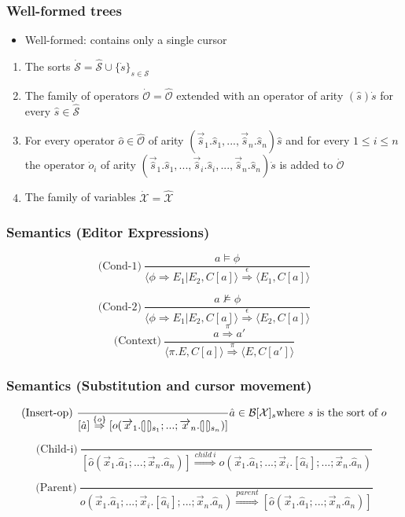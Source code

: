 \documentclass[t,24pt,aspectratio=169]{beamer}
\newcommand{\cleftsemicirc}{\put(3.5,2.5){\oval(5,10)[l]}\put(3.5,-2.5){\line(0,0){10}}\phantom{\circ}}
\newcommand{\crightsemicirc}{\put(1.5,2.5){\oval(5,10)[r]}\put(1.5,-2.5){\line(0,0){10}}\phantom{\circ}}
\newcommand{\hole}{\cleftsemicirc \crightsemicirc}
\newcommand{\hole}[1]{\llparenthesis \ \rrparenthesis_#1} %
\renewcommand{\vec}[1]{\overrightarrow{#1}}
\begin{document}
\begin{frame}
    \frametitle{Well-formed trees}
    \begin{itemize}
        \item Well-formed: contains only a single cursor
    \end{itemize}
    \vspace{1cm}
    \begin{enumerate}
        \item The sorts $\dot{\mathcal{S}} = \hat{\mathcal{S}} \cup \{ \dot{s} \}_{s \in \mathcal{S}}$
        \item The family of operators $\dot{\mathcal{O}} = \hat{\mathcal{O}}$ extended with an operator of arity $(\hat{s})\dot{s}$ for every $\hat{s} \in \hat{\mathcal{S}}$
        \item For every operator $\hat{o} \in \hat{\mathcal{O}}$ of arity $(\vec{\hat{s}}_1.\hat{s}_1,...,\vec{\hat{s}}_n.\hat{s}_n)\hat{s}$ and for every $1 \leq i \leq n$ the operator $\dot{o}_i$ of arity $(\vec{\hat{s}}_1.\hat{s}_1,...,\vec{\hat{s}}_i.\hat{s}_i,...,\vec{\hat{s}}_n.\hat{s}_n)\dot{s}$ is added to $\dot{\mathcal{O}}$
        \item The family of variables $\dot{\mathcal{X}} = \hat{\mathcal{X}}$
    \end{enumerate}
\end{frame}

\begin{frame}
    \frametitle{Semantics (Editor Expressions)}

    \[
        \text{(Cond-1)} \ \frac{a \models \phi}{\langle \phi \Rightarrow E_1|E_2, C[a] \rangle \stackrel{\epsilon}{\Rightarrow} \langle E_1, C[a] \rangle}
    \]

    \[
        \text{(Cond-2)} \ \frac{a \not\models \phi}{\langle \phi \Rightarrow E_1|E_2, C[a] \rangle \stackrel{\epsilon}{\Rightarrow} \langle E_2, C[a] \rangle}
    \]
    \[
        \text{(Context)} \ \frac{a \stackrel{\pi}{\Rightarrow} a'}{\langle \pi.E,C[a] \rangle \stackrel{\pi}{\Rightarrow} \langle E,C[a'] \rangle}
    \]
\end{frame}

\begin{frame}
    \frametitle{Semantics (Substitution and cursor movement)}
    \[
        \text{(Insert-op)} \ \frac{}{[\hat{a}] \stackrel{\{ o \}}{\Rightarrow} [o(\vec{x}_1.\hole_{s_1};...;\vec{x}_n.\hole_{s_n})]} \hat{a} \in \mathcal{B}[\mathcal{X}]_s \text{where } s \text{ is the sort of } o
    \]

    \vspace{1cm}

    \[
        \text{(Child-i)} \ \frac{}{[\hat{o}(\vec{x}_1.\hat{a}_1;...;\vec{x}_n.\hat{a}_n)] \stackrel{child \ i}{\Rightarrow} o(\vec{x}_1.\hat{a}_1;...;\vec{x}_i.[\hat{a}_i];...;\vec{x}_n.\hat{a}_n)}
    \]

    \[
        \text{(Parent)} \ \frac{}{o(\vec{x}_1.\hat{a}_1;...;\vec{x}_i.[\hat{a}_i];...;\vec{x}_n.\hat{a}_n) \stackrel{parent}{\Rightarrow} [\hat{o}(\vec{x}_1.\hat{a}_1;...;\vec{x}_n.\hat{a}_n)]}
    \]
\end{frame}
\end{document}
